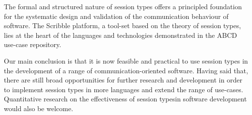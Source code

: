 
The formal and structured nature of session types
offers a principled foundation for the systematic design and validation of the communication behaviour of software. 
The Scribble platform, a tool-set based on the
theory of session types, lies at the heart of the languages and technologies demonstrated in the ABCD use-case repository.

Our main conclusion is that it is now feasible and practical to use session types in the development of a range of communication-oriented software. Having said that, there are still broad opportunities for further research and development in order to implement session types in more languages and extend the range of use-cases. Quantitative research on the effectiveness of session typesin software development would also be welcome.
 
